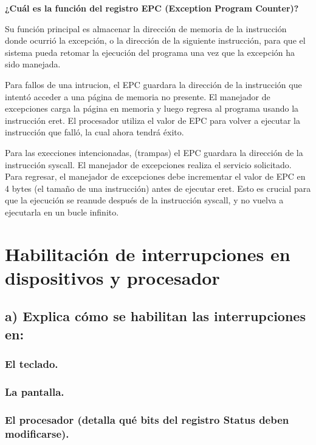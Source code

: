 \documentclass{article}
\begin{document}
{{\quad
\newpage


\textbf{¿Cuál es la función del registro EPC (Exception Program Counter)?}

\quad

{Su función principal es almacenar la dirección de memoria de la instrucción donde ocurrió la excepción, o la dirección de la siguiente instrucción, para que el sistema pueda retomar la ejecución del programa una vez que la excepción ha sido manejada.}

\quad

{Para fallos de una intrucion, el EPC guardara la dirección de la instrucción que intentó acceder a una página de memoria no presente. El manejador de excepciones carga la página en memoria y luego regresa al programa usando la instrucción eret. El procesador utiliza el valor de EPC para volver a ejecutar la instrucción que falló, la cual ahora tendrá éxito.}

\quad

{Para las execciones intencionadas, (trampas) el EPC guardara la dirección de la instrucción syscall. El manejador de excepciones realiza el servicio solicitado. Para regresar, el manejador de excepciones debe incrementar el valor de EPC en 4 bytes (el tamaño de una instrucción) antes de ejecutar eret. Esto es crucial para que la ejecución se reanude después de la instrucción syscall, y no vuelva a ejecutarla en un bucle infinito.}

\quad
\newpage







\section{Habilitación de interrupciones en dispositivos y procesador}

\subsection*{a) Explica cómo se habilitan las interrupciones en:}
\subsubsection*{El teclado.}
\subsubsection*{La pantalla.}
\subsubsection*{El procesador (detalla qué bits del registro Status deben modificarse).}

}}
\end{document}
